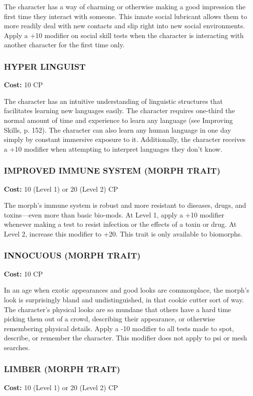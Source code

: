 The character has a way of charming or otherwise making a good impression the
first time they interact with someone. This innate social lubricant allows them
to more readily deal with new contacts and slip right into new social
environments. Apply a +10 modifier on social skill tests when the character is
interacting with another character for the first time only.

\subsubsection{HYPER LINGUIST}
\textbf{Cost:} 10 CP

The character has an intuitive understanding of linguistic structures that
facilitates learning new languages easily. The character requires one-third the
normal amount of time and experience to learn any language (see Improving
Skills, p. 152). The character can also learn any human language in one day
simply by constant immersive exposure to it. Additionally, the character
receives a +10 modifier when attempting to interpret languages they don’t know.

\subsubsection{IMPROVED IMMUNE SYSTEM (MORPH TRAIT)}
\textbf{Cost:} 10 (Level 1) or 20 (Level 2) CP

The morph’s immune system is robust and more resistant to diseases, drugs, and
toxins—even more than basic bio-mods. At Level 1, apply a +10 modifier whenever
making a test to resist infection or the effects of a toxin or drug. At Level
2, increase this modifier to +20. This trait is only available to biomorphs.

\subsubsection{INNOCUOUS (MORPH TRAIT)}
\textbf{Cost:} 10 CP

In an age when exotic appearances and good looks are commonplace, the morph’s
look is surprisingly bland and undistinguished, in that cookie cutter sort of
way. The character’s physical looks are so mundane that others have a hard time
picking them out of a crowd, describing their appearance, or otherwise
remembering physical details. Apply a -10 modifier to all tests made to spot,
describe, or remember the character. This modifier does not apply to psi or
mesh searches.

\subsubsection{LIMBER (MORPH TRAIT)}
\textbf{Cost:} 10 (Level 1) or 20 (Level 2) CP

